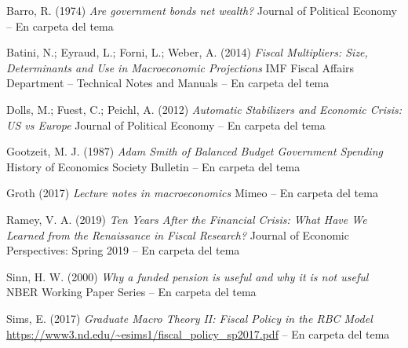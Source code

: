 \documentclass{nuevotema}
\begin{document}
Barro, R. (1974) \textit{Are government bonds net wealth?} Journal of Political Economy -- En carpeta del tema

Batini, N.; Eyraud, L.; Forni, L.; Weber, A. (2014) \textit{Fiscal Multipliers: Size, Determinants and Use in Macroeconomic Projections} IMF Fiscal Affairs Department -- Technical Notes and Manuals -- En carpeta del tema

Dolls, M.; Fuest, C.; Peichl, A. (2012) \textit{Automatic Stabilizers and Economic Crisis: US vs Europe} Journal of Political Economy -- En carpeta del tema

Gootzeit, M. J. (1987) \textit{Adam Smith of Balanced Budget Government Spending} History of Economics Society Bulletin -- En carpeta del tema

Groth (2017) \textit{Lecture notes in macroeconomics} Mimeo -- En carpeta del tema

Ramey, V. A. (2019) \textit{Ten Years After the Financial Crisis: What Have We Learned from the Renaissance in Fiscal Research?} Journal of Economic Perspectives: Spring 2019 -- En carpeta del tema

Sinn, H. W. (2000) \textit{Why a funded pension is useful and why it is not useful} NBER Working Paper Series -- En carpeta del tema

Sims, E. (2017) \textit{Graduate Macro Theory II: Fiscal Policy in the RBC Model} \url{https://www3.nd.edu/~esims1/fiscal_policy_sp2017.pdf} -- En carpeta del tema
\end{document}
